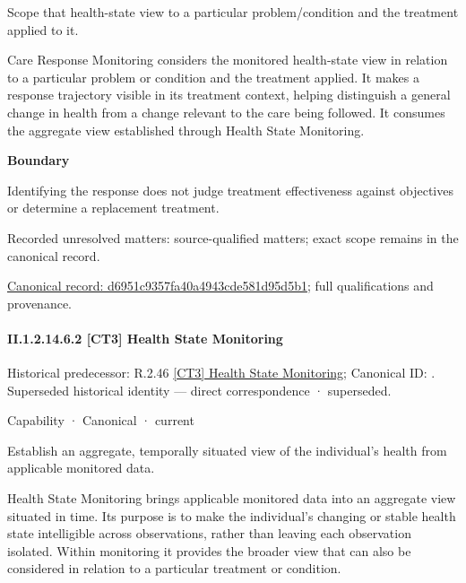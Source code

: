 Scope that health-state view to a particular problem/condition and the treatment applied to it.



Care Response Monitoring considers the monitored health-state view in relation to a particular problem or condition and the treatment applied. It makes a response trajectory visible in its treatment context, helping distinguish a general change in health from a change relevant to the care being followed. It consumes the aggregate view established through Health State Monitoring.



\textbf{Boundary}



Identifying the response does not judge treatment effectiveness against objectives or determine a replacement treatment.


{\small Recorded unresolved matters: source-qualified matters; exact scope remains in the canonical record.}\par
{\footnotesize \href{../../../../continuum/strategy/capability/d6951c9357fa40a4943cde581d95d5b1.md}{Canonical record: d6951c9357fa40a4943cde581d95d5b1}; full qualifications and provenance.}\par
\paragraph*{II.1.2.14.6.2 [CT3] Health State Monitoring}
\label{navigation:II.1.2.14.6.2}

{\small Historical predecessor: R.2.46 \hyperref[element:346f024f74b447a8b6056b9d521837ff]{[CT3] Health State Monitoring}; Canonical ID: \texttt{}. Superseded historical identity — direct correspondence · superseded.}\par
\label{element:d77f22909f8b47dba4cbd95982e576df}
{\small Capability · Canonical · current}\par

Establish an aggregate, temporally situated view of the individual’s health from applicable monitored data.



Health State Monitoring brings applicable monitored data into an aggregate view situated in time. Its purpose is to make the individual's changing or stable health state intelligible across observations, rather than leaving each observation isolated. Within monitoring it provides the broader view that can also be considered in relation to a particular treatment or condition.



